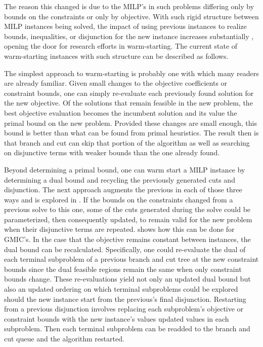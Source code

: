 \documentclass[10pt]{article}
\begin{document}
	The reason this changed is due to the MILP's in such problems differing only by bounds on the constraints or only by objective. With such rigid structure between MILP instances being solved, the impact of using previous instances to realize bounds, inequalities, or disjunction for the new instance increases substantially \cite{ws}, opening the door for research efforts in warm-starting. The current state of warm-starting instances with such structure can be described as follows.
	
	The simplest approach to warm-starting is probably one with which many readers are already familiar. Given small changes to the objective coefficients or constraint bounds, one can simply re-evaluate each previously found solution for the new objective. Of the solutions that remain feasible in the new problem, the best objective evaluation becomes the incumbent solution and its value the primal bound on the new problem. Provided these changes are small enough, this bound is better than what can be found from primal heuristics. The result then is that branch and cut can skip that portion of the algorithm as well as searching on disjunctive terms with weaker bounds than the one already found.
	
	Beyond determining a primal bound, one can warm start a MILP instance by determining a dual bound and recycling the previously generated cuts and disjunction. The next approach augments the previous in each of those three ways and is explored in \cite{ws}. If the bounds on the constraints changed from a previous solve to this one, some of the cuts generated during the solve could be parameterized, then consequently updated, to remain valid for the new problem when their disjunctive terms are repeated. \cite{guz} shows how this can be done for GMIC’s. In the case that the objective remains constant between instances, the dual bound can be recalculated. Specifically, one could re-evaluate the dual of each terminal subproblem of a previous branch and cut tree at the new constraint bounds since the dual feasible regions remain the same when only constraint bounds change. These re-evaluations yield not only an updated dual bound but also an updated ordering on which terminal subproblems could be explored should the new instance start from the previous's final disjunction. Restarting from a previous disjunction involves replacing each subproblem's objective or constraint bounds with the new instance's values updated values in each subproblem. Then each terminal subproblem can be readded to the branch and cut queue and the algorithm restarted.
	
\end{document}
